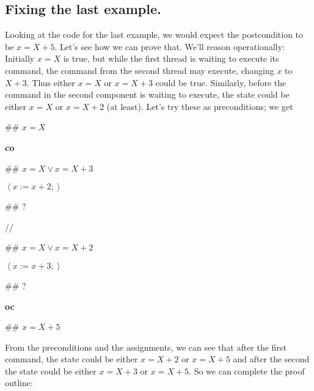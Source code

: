 \documentclass[muchmore,11pt]{article}%
\begin{document}
\subsection{Fixing the last example.}

Looking at the code for the last example, we would expect the postcondition to
be $x=X+5$. Let's see how we can prove that. We'll reason operationally:
Initially $x=X$ is true, but while the first thread is waiting to execute its
command, the command from the second thread may execute, changing $x$ to
$X+3$. Thus either $x=X$ or $x=X+3$ could be true. Similarly, before the
command in the second component is waiting to execute, the state could be
either $x=X$ or $x=X+2$ (at least). Let's try these as preconditions; we get

\begin{code}
\#\# $x=X$

\textbf{co}

\begin{indent}
\item \#\# $x=X\vee x=X+3$

\item $\left\langle x:=x+2;\right\rangle $

\item \#\# $?$
\end{indent}

//

\begin{indent}
\item \#\# $x=X\vee x=X+2$

\item $\left\langle x:=x+3;\right\rangle $

\item \#\# $?$
\end{indent}

\textbf{oc}

\#\# $x=X+5$
\end{code}

From the preconditions and the assignments, we can see that after the first
command, the state could be either $x=X+2$ or $x=X+5$ and after the second the
state could be either $x=X+3$ or $x=X+5$. So we can complete the proof outline:
\end{document}
